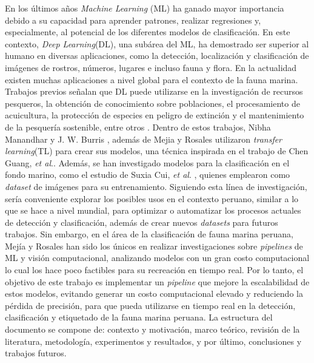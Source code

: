 
En los últimos años \textit{Machine Learning} (ML) ha ganado  
mayor importancia debido a su capacidad para aprender patrones, 
realizar regresiones y, especialmente, al potencial de los diferentes 
modelos de clasificación. En este contexto, \textit{Deep Learning}(DL), 
una subárea del ML, ha demostrado ser superior al humano en diversas 
aplicaciones, como la detección, localización y clasificación de imágenes 
de rostros, números, lugares e incluso fauna y flora.
\newline
\newline
En la actualidad existen muchas aplicaciones a nivel global para el contexto de 
la fauna marina. Trabajos previos señalan que DL puede utilizarse 
en la investigación de recursos pesqueros, la obtención de conocimiento 
sobre poblaciones, el procesamiento de acuicultura, la protección de 
especies en peligro de extinción y el mantenimiento de la pesquería 
sostenible, entre otros 
\cite{10.1145/3419635.3419643, 10.1145/3325917.3325934,20.500.12724/11174,8371919}.
\newline
\newline
Dentro de estos trabajos, Nibha Manandhar y J. W. Burris 
\cite{10.1145/3325917.3325934}, además de Mejia y Rosales 
\cite{20.500.12724/11174} utilizaron \textit{transfer learning}(TL) 
para crear sus modelos, una técnica inspirada en el trabajo de Chen Guang, 
\textit{et al}.\cite{8371919}. Además, se han investigado modelos para la 
clasificación en el fondo marino, como el estudio de Suxia Cui, 
\textit{et al}. \cite{Cui2020}, quienes emplearon \cite{ImageNet} como 
\textit{dataset} de imágenes para su entrenamiento. 
\newline
\newline
Siguiendo esta línea de investigación, sería conveniente explorar 
los posibles usos en el contexto peruano, similar a lo que se hace a nivel 
mundial, para optimizar o automatizar los procesos actuales de detección y 
clasificación, además de crear nuevos \textit{datasets} para futuros trabajos. 
Sin embargo, en el área de la clasificación de fauna marina 
peruana, Mejía y Rosales \cite{20.500.12724/11174} han sido los únicos en 
realizar investigaciones sobre \textit{pipelines} de ML y visión 
computacional, analizando modelos con un gran costo computacional lo cual 
los hace poco factibles para su recreación en tiempo real.
\newline
\newline
Por lo tanto, el objetivo de este trabajo es implementar un \textit{pipeline} 
que mejore la escalabilidad de estos modelos, evitando generar un costo 
computacional elevado y reduciendo la pérdida de precisión, para que pueda 
utilizarse en tiempo real en la detección, clasificación y etiquetado de la 
fauna marina peruana. 
La estructura del documento se compone de: contexto y motivación, marco 
teórico, revisión de la literatura, metodología, experimentos y resultados, 
y por último, conclusiones y trabajos futuros.